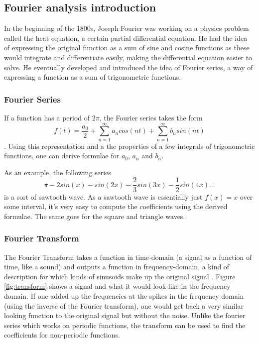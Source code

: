 \subsection{Fourier analysis introduction}
In the beginning of the 1800s, Joseph Fourier was working on a physics problem called the heat equation, a certain partial differential equation. He had the idea of expressing the original function as a sum of sine and cosine functions as these would integrate and differentiate easily, making the differential equation easier to solve. He eventually developed and introduced the idea of Fourier series, a way of expressing a function as a sum of trigonometric functions. 
\subsubsection{Fourier Series} 
If a function has a period of $2\pi$, the Fourier series takes the form $$f(t) = \frac{a_0}{2} + \sum_{n=1}^{\infty}a_ncos(nt)+\sum_{n=1}^{\infty}b_nsin(nt)$$. Using this representation and a the properties of a few integrals of trigonometric functions, one can derive formulae for $a_0$, $a_n$ and $b_n$.

As an example, the following series $$\pi -2sin(x) -sin(2x) -\frac{2}{3}sin(3x) -\frac{1}{2}sin(4x) ... $$ is a sort of sawtooth wave. As a sawtooth wave is essentially just $f(x) = x$ over some interval, it's very easy to compute the coefficients using the derived formulae. The same goes for the square and triangle waves.
 
\subsubsection{Fourier Transform} 
The Fourier Transform takes a function in time-domain (a signal as a function of time, like a sound) and outputs a function in frequency-domain, a kind of description for which kinds of sinusoids make up the original signal \cite{SimonXu2015}. Figure \ref{fig:transform} shows a signal and what it would look like in the frequency domain. If one added up the frequencies at the spikes in the frequency-domain (using the inverse of the Fourier transform), one would get back a very similar looking function to the original signal but without the noise. Unlike the fourier series which works on periodic functions, the transform can be used to find the coefficients for non-periodic functions.

